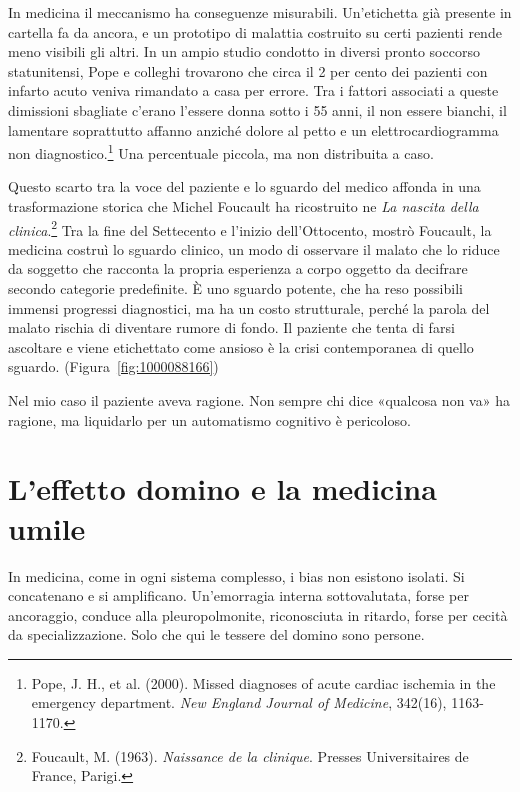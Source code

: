 In medicina il meccanismo ha conseguenze misurabili. Un'etichetta gi\`{a} presente in cartella fa da ancora, e un prototipo di malattia costruito su certi pazienti rende meno visibili gli altri. In un ampio studio condotto in diversi pronto soccorso statunitensi, Pope e colleghi trovarono che circa il 2 per cento dei pazienti con infarto acuto veniva rimandato a casa per errore. Tra i fattori associati a queste dimissioni sbagliate c'erano l'essere donna sotto i 55 anni, il non essere bianchi, il lamentare soprattutto affanno anzich\'{e} dolore al petto e un elettrocardiogramma non diagnostico.\footnote{Pope, J. H., et al. (2000). Missed diagnoses of acute cardiac ischemia in the emergency department. \textit{New England Journal of Medicine}, 342(16), 1163-1170.} Una percentuale piccola, ma non distribuita a caso.

Questo scarto tra la voce del paziente e lo sguardo del medico affonda in una trasformazione storica che Michel Foucault ha ricostruito ne \textit{La nascita della clinica}.\footnote{Foucault, M. (1963). \textit{Naissance de la clinique}. Presses Universitaires de France, Parigi.} Tra la fine del Settecento e l'inizio dell'Ottocento, mostr\`{o} Foucault, la medicina costru\`{i} lo sguardo clinico, un modo di osservare il malato che lo riduce da soggetto che racconta la propria esperienza a corpo oggetto da decifrare secondo categorie predefinite. \`{E} uno sguardo potente, che ha reso possibili immensi progressi diagnostici, ma ha un costo strutturale, perch\'{e} la parola del malato rischia di diventare rumore di fondo. Il paziente che tenta di farsi ascoltare e viene etichettato come ansioso \`{e} la crisi contemporanea di quello sguardo. (Figura~\ref{fig:1000088166})

Nel mio caso il paziente aveva ragione. Non sempre chi dice «qualcosa non va» ha ragione, ma liquidarlo per un automatismo cognitivo \`{e} pericoloso.

\section{L'effetto domino e la medicina umile}

In medicina, come in ogni sistema complesso, i bias non esistono isolati. Si concatenano e si amplificano. Un'emorragia interna sottovalutata, forse per ancoraggio, conduce alla pleuropolmonite, riconosciuta in ritardo, forse per cecit\`{a} da specializzazione. Solo che qui le tessere del domino sono persone.

